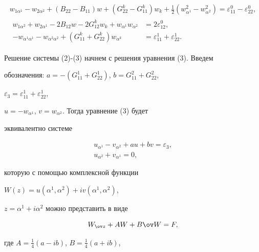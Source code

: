 \begin{gather} 


w_{1\alpha^1}-w_{2\alpha^2}+(B_{22}-B_{11})w+ 


(G^k_{22}-G^k_{11})w_k+\tfrac{1}{2}(w^2_{\alpha^1}- 


w^2_{\alpha^2})=\varepsilon^0_{11}-\varepsilon^0_{22}, \\ 


\begin{split} 


w_{1\alpha^2}+w_{2\alpha^1}-2B_{12}w-2G^k_{12}w_k+ 


w_{\alpha^1}w_{\alpha^2}&=2\varepsilon^0_{12},\\ 


-w_{\alpha^1\alpha^1}-w_{\alpha^2\alpha^2}+ 


(G^k_{11}+G^k_{22})w_{\alpha^k}&=\varepsilon^1_{11}+ 


\varepsilon^1_{22}. 


\end{split} 


\end{gather} 


Решение системы (2)-(3) начнем с решения уравнения (3). Введем 


обозначения: $a=-(G^1_{11}+G^1_{22})$, $b=G^2_{11}+G^2_{22}$, 


$\varepsilon_3=\varepsilon^1_{11}+\varepsilon^1_{22}$, 


$u=-w_{\alpha^1}$, $v=w_{\alpha^2}$. Тогда уравнение (3) будет 


эквивалентно системе 


\begin{gather*} 


u_{\alpha^1}-v_{\alpha^2}+au+bv=\varepsilon_3, \\ 


u_{\alpha^2}+v_{\alpha^1}=0, 


\end{gather*} 


которую с помощью комплексной функции 


$W(z)=u(\alpha^1,\alpha^2)+iv(\alpha^1,\alpha^2)$, 


$z=\alpha^1+i\alpha^2$ можно представить в виде 


\begin{equation} 


W_{\ov z}+AW+B\ov W=F, 


\end{equation} 


где $A=\tfrac{1}{4}(a-ib)$, $B=\tfrac{1}{4}(a+ib)$, 


